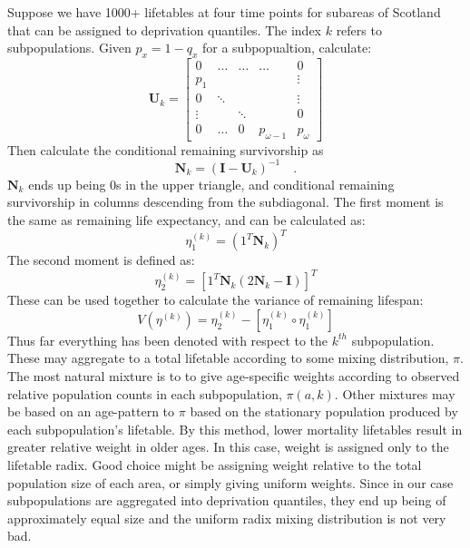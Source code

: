\documentclass[12pt,oneside,a4paper]{article} %
\theoremstyle{definition}
\begin{document}
Suppose we have 1000+ lifetables at four time points for subareas of Scotland
that can be assigned to deprivation quantiles. The index $k$ refers to
subpopulations. Given $p_x = 1- q_x$ for a subpopualtion, calculate:
\begin{equation}
\mathbf{U}_k = 
\begin{bmatrix}
    0     & \hdots  & \hdots &  \hdots  & 0 \\
    p_{1} &   &    &    &  \vdots \\
    0 & \ddots &   &   & \vdots \\
    \vdots & & \ddots & & 0\\
   0 &  \hdots & 0 & p_{\omega-1}  & p_{\omega}
\end{bmatrix}
\end{equation}
Then calculate the conditional remaining survivorship as
\begin{equation}
\mathbf{N}_k = (\mathbf{I} - \mathbf{U}_k )^{-1} \quad .
\end{equation}
$\mathbf{N}_k$ ends up being 0s in the upper triangle, and conditional remaining
survivorship in columns descending from the subdiagonal. The first moment is the
same as remaining life expectancy, and can be calculated as:
\begin{equation}
\eta^{(k)}_1 = (1^T \mathbf{N}_k)^T
\end{equation}
The second moment is defined as:
\begin{equation}
\eta^{(k)}_2 = \left[ 1^T \mathbf{N}_k (2\mathbf{N}_k - \mathbf{I})\right]^T
\end{equation}
These can be used together to calculate the variance of remaining lifespan:
\begin{equation}
\label{eq:var}
V(\eta^{(k)}) = \eta^{(k)}_2 - \left[\eta^{(k)}_1 \circ \eta^{(k)}_1 \right]
\end{equation}
Thus far everything has been denoted with respect to the $k^{th}$ subpopulation.
These may aggregate to a total lifetable according to some mixing distribution,
$\pi$.
The most natural mixture is to to give age-specific weights according to
observed relative population counts in each subpopulation, $\pi(a,k)$. Other
mixtures may be based on an age-pattern to $\pi$ based on the stationary
population produced by each subpopulation's lifetable. By this method, lower
mortality lifetables result in greater relative weight in older ages. In this
case, weight is assigned only to the lifetable radix. Good choice might be
assigning weight relative to the total population size of each area, or simply
giving uniform weights. Since in our case subpopulations are aggregated into
deprivation quantiles, they end up being of approximately equal size and the
uniform radix mixing distribution is not very bad. 
\end{document}
